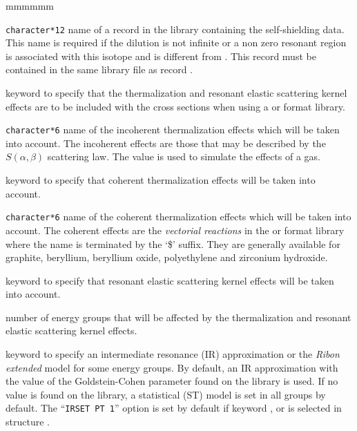 \begin{ListeDeDescription}{mmmmmm}
\item[\dusa{NAMS}] {\tt character*12} name of a record in the library
containing the self-shielding data. This name is required if the dilution is
not infinite or a non zero resonant region is associated with this isotope and 
is different from . This record must be contained in the same
library file as record .

\item[\moc{THER}] keyword to specify that the thermalization and resonant elastic
scattering kernel effects are to be included with the cross sections when using a
 or  format library.

\item[\dusa{HINC}] {\tt character*6} name  of the incoherent thermalization
effects which will be taken into account. The incoherent effects are those that
may be described by the $S(\alpha,\beta)$ scattering law. The value 
is used to simulate the effects of a gas.

\item[\moc{TCOH}]  keyword to specify that coherent thermalization effects
will be taken into account.

\item[\dusa{HCOH}] {\tt character*6} name of the coherent thermalization
effects which will be taken into account. The coherent effects are the
{\sl vectorial reactions} in the  or  format library where
the name is terminated by the `\$' suffix. They are generally available for
graphite, beryllium, beryllium oxide, polyethylene and zirconium hydroxide.

\item[\moc{RESK}]  keyword to specify that resonant elastic scattering kernel effects
will be taken into account.

\item[\dusa{ntfg}]  number of energy groups that will be affected by the
thermalization and resonant elastic scattering kernel effects.

\item[\moc{IRSET}] keyword to specify an intermediate resonance (IR)
approximation or the {\sl Ribon extended} model for some energy groups. By default, an
IR approximation with the value of the Goldstein-Cohen parameter found on the library
is used. If no value is found on the library, a statistical (ST) model\cite{st} is set in
all groups by default. The ``{\tt IRSET PT 1}'' option is set by default if keyword ,  or
 is selected in structure .


\end{ListeDeDescription}
